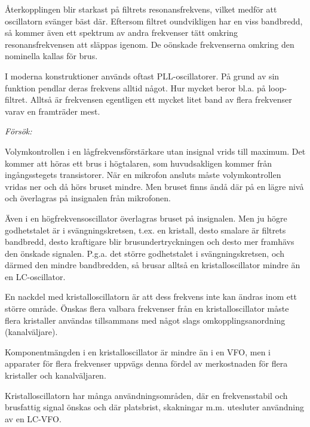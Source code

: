 Återkopplingen blir starkast på filtrets resonansfrekvens, vilket
medför att oscillatorn svänger bäst där. Eftersom filtret oundvikligen
har en viss bandbredd, så kommer även ett spektrum av andra frekvenser
tätt omkring resonansfrekvensen att släppas igenom. De oönskade
frekvenserna omkring den nominella kallas för brus.

I moderna konstruktioner används oftast PLL-oscillatorer. På grund av
sin funktion pendlar deras frekvens alltid något. Hur mycket beror
bl.a. på loop-filtret. Alltså är frekvensen egentligen ett mycket
litet band av flera frekvenser varav en framträder mest.

\emph{Försök:}

Volymkontrollen i en lågfrekvensförstärkare utan insignal vrids till
maximum. Det kommer att höras ett brus i högtalaren, som huvudsakligen
kommer från ingångsstegets transistorer. När en mikrofon ansluts måste
volymkontrollen vridas ner och då hörs bruset mindre. Men bruset finns
ändå där på en lägre nivå och överlagras på insignalen från
mikrofonen.

Även i en högfrekvensoscillator överlagras bruset på insignalen. Men
ju högre godhetstalet är i svängningskretsen, t.ex. en kristall, desto
smalare är filtrets bandbredd, desto kraftigare blir
brusundertryckningen och desto mer framhävs den önskade
signalen. P.g.a. det större godhetstalet i svängningskretsen, och
därmed den mindre bandbredden, så brusar alltså en kristalloscillator
mindre än en LC-oscillator.

En nackdel med kristalloscillatorn är att dess frekvens inte kan
ändras inom ett större område. Önskas flera valbara frekvenser från en
kristalloscillator måste flera kristaller användas tillsammans med
något slags omkopplingsanordning (kanalväljare).

Komponentmängden i en kristalloscillator är mindre än i en VFO, men i
apparater för flera frekvenser uppvägs denna fördel av merkostnaden
för flera kristaller och kanalväljaren.

Kristalloscillatorn har många användningsområden, där en
frekvensstabil och brusfattig signal önskas och där platsbrist,
skakningar m.m. utesluter användning av en LC-VFO.
